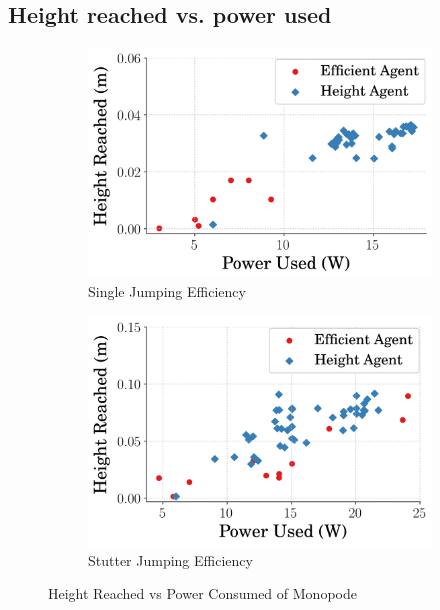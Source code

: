 \subsection{Height reached vs. power used}
\label{subsection:avg_power_used}
% 
\begin{figure}[tb!]
    \centering
    \begin{subfigure}{.49\textwidth}
      \centering
      \includegraphics[width=\linewidth]{Figures/Ch2/One_HeightVsPower.png}
      \caption{Single Jumping Efficiency}
      \label{fig:single_heightvspower}
    \end{subfigure}%
    \hfill
    \begin{subfigure}{.49\textwidth}
      \centering
      \includegraphics[width=\linewidth]{Figures/Ch2/Stutter_HeightVsPower.png}
       \caption{Stutter Jumping Efficiency}
       \label{fig:stutter_heightvspower}
    \end{subfigure}
     \caption{Height Reached vs Power Consumed of Monopode}
     \label{fig:heightvspower}
\end{figure}
%

